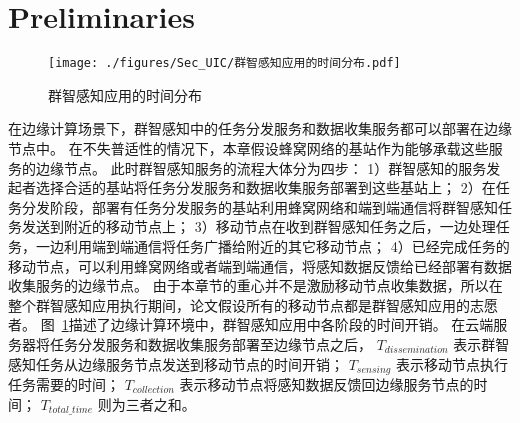 \section{Preliminaries}


\begin{figure}[!b]
  \centering
  \vspace{-1em}
  \texttt{[image: ./figures/Sec\_UIC/群智感知应用的时间分布.pdf]}
  \vspace{-0.5em}
  \caption{群智感知应用的时间分布}
  \label{Figure_MCS_Delay}
\end{figure}

在边缘计算场景下，群智感知中的任务分发服务和数据收集服务都可以部署在边缘节点中。
在不失普适性的情况下，本章假设蜂窝网络的基站作为能够承载这些服务的边缘节点。
此时群智感知服务的流程大体分为四步：
1）群智感知的服务发起者选择合适的基站将任务分发服务和数据收集服务部署到这些基站上；
2）在任务分发阶段，部署有任务分发服务的基站利用蜂窝网络和端到端通信将群智感知任务发送到附近的移动节点上；
3）移动节点在收到群智感知任务之后，一边处理任务，一边利用端到端通信将任务广播给附近的其它移动节点；
4）已经完成任务的移动节点，可以利用蜂窝网络或者端到端通信，将感知数据反馈给已经部署有数据收集服务的边缘节点。
由于本章节的重心并不是激励移动节点收集数据，所以在整个群智感知应用执行期间，论文假设所有的移动节点都是群智感知应用的志愿者。
图~\ref{Figure_MCS_Delay}描述了边缘计算环境中，群智感知应用中各阶段的时间开销。
在云端服务器将任务分发服务和数据收集服务部署至边缘节点之后，
$T_{dissemination}$ 表示群智感知任务从边缘服务节点发送到移动节点的时间开销；
$T_{sensing}$ 表示移动节点执行任务需要的时间；
$T_{collection}$ 表示移动节点将感知数据反馈回边缘服务节点的时间；
$T_{total\_time}$ 则为三者之和。



